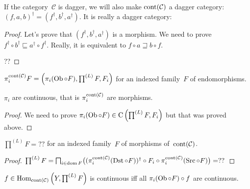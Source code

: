 If the category~$\mathcal{C}$ is dagger, we will also make $\operatorname{cont}(\mathcal{C})$ a dagger category: $(f,a,b)^{\dagger}=(f^{\dagger},b^{\dagger},a^{\dagger})$. It is really a dagger category:

\begin{proof}
Let's prove that $(f^{\dagger},b^{\dagger},a^{\dagger})$ is a morphism. We need to prove
$f^{\dagger}\circ b^{\dagger}\sqsubseteq a^{\dagger}\circ f^{\dagger}$. Really, it is equivalent to
$f\circ a\sqsupseteq b\circ f$.

??
\end{proof}

\begin{defn}
  $\pi^{\operatorname{cont} (\mathcal{C})}_i F = \left( \pi_i(\operatorname{Ob}\circ F), \prod^{(L)} F , F_i \right)$ for an indexed family~$F$ of endomorphisms.
\end{defn}

\begin{prop}
  $\pi_i$ are continuous, that is $\pi^{\operatorname{cont}
  (\mathcal{C})}_i$ are morphisms.
\end{prop}

\begin{proof}
  We need to prove $\pi_i(\operatorname{Ob}\circ F) \in \mathrm{C} \left( \prod^{(L)} F , F_i \right)$
  but that was proved above.
\end{proof}

\begin{thm}
$\prod^{(L)} F = ??$ for an indexed family~$F$ of morphisms of~$\operatorname{cont}(\mathcal{C})$.
\end{thm}

\begin{proof}
$\prod^{(L)} F = \bigsqcap_{i \in \operatorname{dom} F} \bigl((\pi^{\operatorname{cont}(\mathcal{C})}_i(\operatorname{Dst}\circ F))^{\dagger} \circ F_i \circ \pi^{\operatorname{cont}(\mathcal{C})}_i(\operatorname{Src}\circ F)\bigr) = ??$
\end{proof}

\begin{lem}
  $f \in \operatorname{Hom}_{\operatorname{cont} (\mathcal{C})} \left( Y ,
  \prod^{(L)} F \right)$ is continuous iff all $\pi_i(\operatorname{Ob}\circ F) \circ f$ are continuous.
\end{lem}

